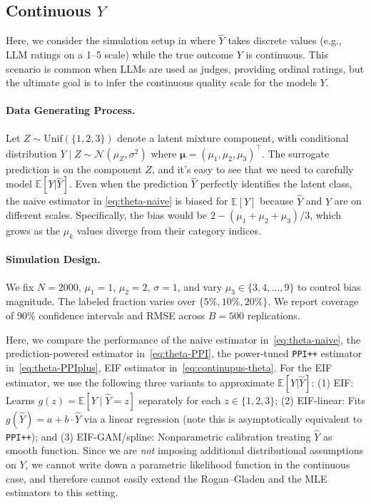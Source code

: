 \documentclass[11pt]{article}
\newcommand{\E}{\mathbb{E}}
\newcommand{\1}{\mathbf{1}}
\newcommand{\cN}{\mathcal{N}}
\newcommand{\hY}{\widehat{Y}}
\newcommand{\bmu}{\bm{\mu}} %
\theoremstyle{remark}
\begin{document}
\subsection{Continuous $Y$}
\label{subsec:sim-continuous-Y}
Here, we consider the simulation setup in \citet{ji2025predictionssurrogatesrevisitingsurrogate} where $\hat{Y}$ takes discrete values (e.g., LLM ratings on a 1--5 scale) while the true outcome $Y$ is continuous. This scenario is common when LLMs are used as judges, providing ordinal ratings, but the ultimate goal is to infer the continuous quality scale for the models $Y$.

\paragraph{Data Generating Process.}
Let $Z \sim \text{Unif}(\{1, 2, 3\})$ denote a latent mixture component, with conditional distribution $Y \mid Z \sim \cN(\mu_Z, \sigma^2)$ where $\bmu = (\mu_1, \mu_2, \mu_3)^\top$. The surrogate prediction is on the component $Z$, and it's easy to see that we need to carefully model $\E[Y|\hY]$. Even when the prediction $\hY$ perfectly identifies the latent class, the naive estimator in \eqref{eq:theta-naive} is biased for $\E[Y]$ because $\hY$ and $Y$ are on different scales. Specifically, the bias would be $2 - (\mu_1 + \mu_2 + \mu_3)/3$, which grows as the $\mu_k$ values diverge from their category indices.

\paragraph{Simulation Design.}
We fix $N = 2000$, $\mu_1 = 1$, $\mu_2 = 2$, $\sigma = 1$, and vary $\mu_3 \in \{3, 4, \ldots, 9\}$ to control bias magnitude. The labeled fraction varies over $\{5\%, 10\%, 20\%\}$. We report coverage of 90\% confidence intervals and RMSE across $B = 500$ replications.

Here, we compare the performance of the naive estimator in~\eqref{eq:theta-naive}, the
  prediction-powered estimator in~\eqref{eq:theta-PPI}, the power-tuned \texttt{PPI++} estimator in~\eqref{eq:theta-PPIplus},
 EIF estimator in~\eqref{eq:continupus-theta}. For the EIF estimator, we use the following three variants to approximate $\E[Y|\hY]$: (1) {EIF}: Learns $g(z) = \E[Y \mid \hY = z]$ separately for each $z \in \{1,2,3\}$; (2) {EIF-linear}: Fits $g(\hY) = a + b \cdot \hY$ via a linear regression (note this is asymptotically equivalent to \texttt{PPI++}); and (3) {EIF-GAM/spline}: Nonparametric calibration treating $\hY$ as smooth function. Since we are \emph{not} imposing additional distributional assumptions on $Y$, we cannot write down a parametric likelihood function in the continuous case, and therefore cannot easily extend the Rogan--Gladen and the MLE estimators to this setting.
\end{document}
